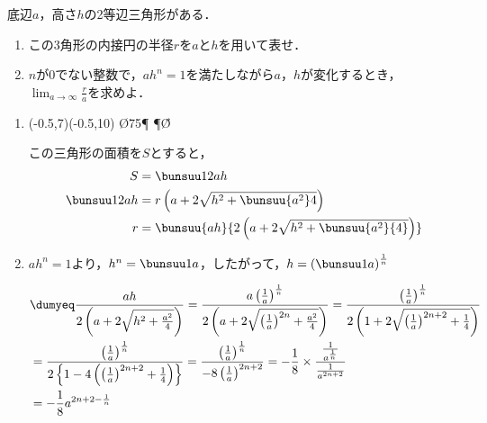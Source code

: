 \begin{problem}
  底辺$a$，高さ$h$の2等辺三角形がある．
\begin{enumerate}
\item この3角形の内接円の半径$r$を$a$と$h$を用いて表せ．
\item $n$が0でない整数で，$ah^n=1$を満たしながら$a$，$h$が変化するとき，
$\displaystyle\lim_{a\to\infty}\frac{r}{a}$を求めよ．
\end{enumerate}
\end{problem}



\begin{enumerate}
  \item
  \begin{mawarikomi}{}{
    \begin{pszahyou*}[ul=4mm](-0.5,7)(-0.5,10)
      \kandk\O{75}\P
      \Suisen\P\O\A\H
      \Takakkei{\O\A\P}
      \Drawline{\P\H}
    \end{pszahyou*}
  }
  この三角形の面積を$S$とすると，
  \begin{align*}
    S &= \bunsuu12ah \\
    \bunsuu12ah &= r\left(a + 2\sqrt{h^2 + \bunsuu{a^2}4}\right) \\
    r &= \bunsuu{ah}{2\left(a + 2\sqrt{h^2 + \bunsuu{a^2}{4}}\right)}
  \end{align*}
\end{mawarikomi}


  \item $ah^n = 1$より，$h^n = \bunsuu1a$，したがって，$h = \left(\bunsuu1a\right)^{\frac1{n}}$

  \begin{align*}
    &\dumyeq
    \frac{ah}{2\left( a+2\sqrt{h^2 + \frac{a^2}{4}} \right)}
    =
    \frac{a\left( \frac{1}{a} \right)^{\frac{1}{n}}}
    {2\left( a + 2\sqrt{\left( \frac{1}{a} \right)^{2n} + \frac{a^2}{4}} \right)}
    =
    \frac{\left( \frac{1}{a} \right)^{\frac{1}{n}}}
    {2\left( 1 + 2\sqrt{\left( \frac{1}{a} \right)^{2n+2} + \frac14} \right)} \\
    &=
    \frac{\left( \frac{1}{a} \right)^{\frac{1}{n}}}
    {2\left\{ 1 - 4\left( \left( \frac{1}{a} \right)^{2n+2} + \frac14 \right) \right\}}
    = \frac{\left( \frac{1}{a} \right)^{\frac{1}{n}}}{-8\left( \frac{1}{a} \right)^{2n+2}}
    = -\frac18 \times \frac{\frac{1}{a^{\frac{1}{n}}}}{\frac{1}{a^{2n+2}}}\\
    &= -\frac18 a^{2n+2-\frac{1}{n}}
  \end{align*}


\end{enumerate}
